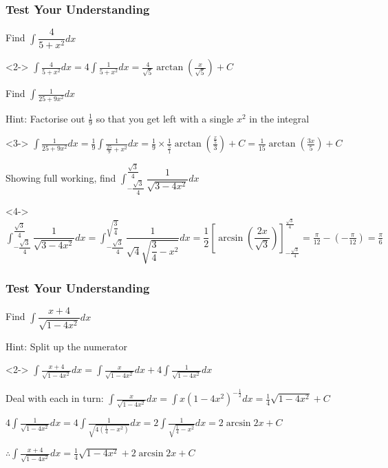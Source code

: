 \documentclass{beamer}
\begin{document}
	\begin{frame}[shrink=40]
		\frametitle{Test Your Understanding}
		\begin{problem}
			Find $\int \dfrac{4}{5+x^{2}} dx$
		\end{problem}
		\begin{solution}<2->
			$\int \frac{4}{5+x^{2}}dx=4\int \frac{1}{5+x^{2}}dx=\frac{4}{\sqrt{5}}\arctan \left( \frac{x}{\sqrt{5}}\right) +C$
		\end{solution}
		
		\begin{problem}
			Find $\int \frac{1}{25+9x^{2}} dx$
		\end{problem}
		\alert{Hint: Factorise out $\frac{1}{9}$ so that you get left with a single $x^{2}$ in the integral}
		\begin{solution}<3->
			$\int \frac{1}{25+9x^{2}} dx=\frac{1}{9}\int \frac{1}{\frac{25}{9}+x^{2}}dx=\frac{1}{9}\times \frac{1}{\frac{5}{1}}\arctan \left( \frac{\frac{x}{5}}{3}\right) +C=\frac{1}{15}\arctan \left( \frac{3x}{5}\right) +C$
		\end{solution}
		
		\begin{problem}
			Showing full working, find $\int ^{\dfrac{\sqrt{3}}{4}}_{-\dfrac{\sqrt{3}}{4}}\dfrac{1}{\sqrt{3-4x^{2}}}dx$
		\end{problem}
		\begin{solution}<4->
			$\int ^{\dfrac{\sqrt{3}}{4}}_{-\dfrac{\sqrt{3}}{4}}\dfrac{1}{\sqrt{3-4x^{2}}}dx=\int ^{\sqrt{\dfrac{3}{4}}}_{-\dfrac{\sqrt{3}}{4}}\dfrac{1}{\sqrt{4}\sqrt{\dfrac{3}{4}-x^{2}}}dx=\dfrac{1}{2}\left[ \arcsin \left( \dfrac{2x}{\sqrt{3}}\right) \right] _{-\frac{\sqrt{3}}{4}}^{\frac{\sqrt{3}}{4}}=\frac{\pi }{12}-\left( -\frac{\pi }{12}\right) =\frac{\pi }{6}$
		\end{solution}
	\end{frame}
	
	\begin{frame}[shrink]
		\frametitle{Test Your Understanding}
		
		\begin{problem}
			Find $\int \dfrac{x+4}{\sqrt{1-4x^{2}}}dx$
		\end{problem}
		\alert{Hint: Split up the numerator}
		\begin{solution}<2->
			$\int \frac{x+4}{\sqrt{1-4x^{2}}}dx = \int \frac{x}{\sqrt{1-4x^{2}}}dx+4\int \frac{1}{\sqrt{1-4x^{2}}}dx$
			
			Deal with each in turn:
			$\int \frac{x}{\sqrt{1-4x^{2}}}dx = \int x\left( 1-4x^{2}\right) ^{-\frac{1}{2}}dx=\frac{1}{4}\sqrt{1-4x^{2}}+C$
			
			$4\int \frac{1}{\sqrt{1-4x^{2}}}dx = 4\int \frac{1}{\sqrt{ 4( \frac{1}{4}-x^{2}) }}dx=2\int \frac{1}{\sqrt{\frac{1}{4}-x^{2}}}dx=2\arcsin 2x+C$
			
			$\therefore \int \frac{x+4}{\sqrt{1-4x^{2}}}dx = \frac{1}{4}\sqrt{1-4x^{2}}+2\arcsin 2x+C$
		\end{solution}
		
	\end{frame}
	
\end{document}
